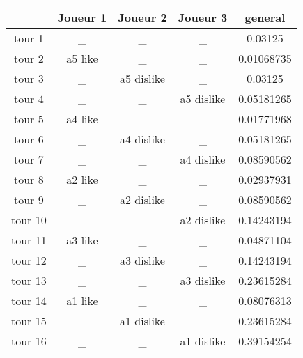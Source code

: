 \documentclass{article}
\begin{document}
\begin{tabular}{|c|c|c|c|c|}
\hline
& Joueur 1 & Joueur 2 & Joueur 3 & general \\
\hline
tour 1 & \_ & \_ & \_ & 0.03125 \\
\hline
tour 2 & a5 like & \_ & \_ & 0.01068735 \\
\hline
tour 3 & \_ & a5 dislike & \_ & 0.03125 \\
\hline
tour 4 & \_ & \_ & a5 dislike & 0.05181265 \\
\hline
tour 5 & a4 like & \_ & \_ & 0.01771968 \\
\hline
tour 6 & \_ & a4 dislike & \_ & 0.05181265 \\
\hline
tour 7 & \_ & \_ & a4 dislike & 0.08590562 \\
\hline
tour 8 & a2 like & \_ & \_ & 0.02937931 \\
\hline
tour 9 & \_ & a2 dislike & \_ & 0.08590562 \\
\hline
tour 10 & \_ & \_ & a2 dislike & 0.14243194 \\
\hline
tour 11 & a3 like & \_ & \_ & 0.04871104 \\
\hline
tour 12 & \_ & a3 dislike & \_ & 0.14243194 \\
\hline
tour 13 & \_ & \_ & a3 dislike & 0.23615284 \\
\hline
tour 14 & a1 like & \_ & \_ & 0.08076313 \\
\hline
tour 15 & \_ & a1 dislike & \_ & 0.23615284 \\
\hline
tour 16 & \_ & \_ & a1 dislike & 0.39154254 \\
\hline
\end{tabular}
\end{document}
